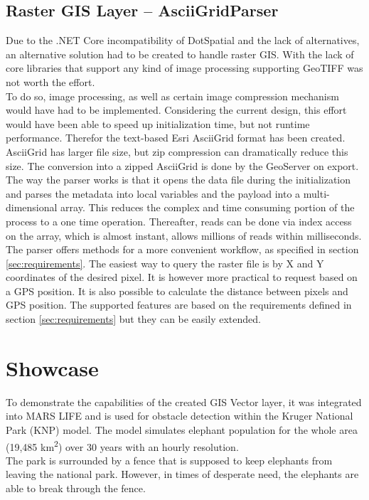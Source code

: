 \subsection{Raster GIS Layer -- AsciiGridParser}
\label{sec:parser}
Due to the .NET Core incompatibility of DotSpatial and the lack of alternatives, an alternative solution had to be created to handle raster GIS. With the lack of core libraries that support any kind of image processing supporting GeoTIFF was not worth the effort.\\
To do so, image processing, as well as certain image compression mechanism would have had to be implemented. Considering the current design, this effort would have been able to speed up initialization time, but not runtime performance. Therefor the text-based Esri AsciiGrid format has been created.\\
AsciiGrid has larger file size, but zip compression can dramatically reduce this size. The conversion into a zipped AsciiGrid is done by the GeoServer on export.\\
The way the parser works is that it opens the data file during the initialization and parses the metadata into local variables and the payload into a multi-dimensional array. This reduces the complex and time consuming portion of the process to a one time operation. Thereafter, reads can be done via index access on the array, which is almost instant, allows millions of reads within milliseconds.\\
The parser offers methods for a more convenient workflow, as specified in section \ref{sec:requirements}. The easiest way to query the raster file is by X and Y coordinates of the desired pixel. It is however more practical to request based on a GPS position. It is also possible to calculate the distance between pixels and GPS position. The supported features are based on the requirements defined in section \ref{sec:requirements} but they can be easily extended.


\section{Showcase}
To demonstrate the capabilities of the created GIS Vector layer, it was integrated into MARS LIFE and is used for obstacle detection within the Kruger National Park (KNP) model. The model simulates elephant population for the whole area (19,485 \si{km^{2}}) over 30 years with an hourly resolution.\\
The park is surrounded by a fence that is supposed to keep elephants from leaving the national park. However, in times of desperate need, the elephants are able to break through the fence.


